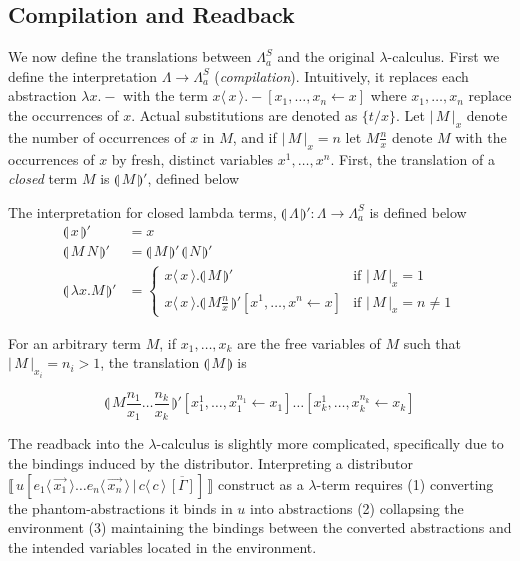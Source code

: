 \documentclass[a4paper,UKenglish,cleveref, autoref]{lipics-v2019}
\newcommand{\FALC}{\Lambda^{S}_{a}}
\newcommand{\abs}[2]{\lambda #1 . #2}
\newcommand{\app}[2]{#1 \, #2}
\newcommand{\fake}[3]{#1 \langle \, #2 \, \rangle . #3}
\newcommand{\share}[3]{#1 [#2 \leftarrow #3]}
\newcommand{\dist}[5]{#1 [ #2 \, \vert \, \fakedist{#4}{#5} \, #3 ]}
\newcommand{\fakedist}[2]{#1 \langle \, #2 \, \rangle}
\newcommand{\size}[1]{\vert \, #1 \, \vert}
\newcommand{\sub}[3]{#1 \{ #2 / #3 \}}
\newcommand{\compile}[1]{\llparenthesis \, #1 \, \rrparenthesis}
\newcommand{\trans}[1]{\llbracket \, #1 \, \rrbracket}
\begin{document}
\subsection{Compilation and Readback}

We now define the translations between $\FALC$ and the original $\lambda$-calculus. First we define the interpretation $\Lambda \rightarrow \FALC$ (\emph{compilation}). Intuitively, it replaces each abstraction $\lambda x . -$ with the term $\fake{x}{x}{\share{-}{x_{1}, \dots, x_{n}}{x}}$ where $x_{1}, \dots, x_{n}$ replace the occurrences of $x$. Actual substitutions are denoted as $\sub{}{t}{x}$. Let $\size{M}_{x}$ denote the number of occurrences of $x$ in $M$, and if $\size{M}_{x} = n$ let $M \frac{n}{x}$ denote $M$ with the occurrences of $x$ by fresh, distinct variables $x^{1}, \dots, x^{n}$. First, the translation of a \emph{closed} term $M$ is $\compile{M}'$, defined below

\begin{definition}[Compilation]
\label{def:compile}
The interpretation for closed lambda terms, $\compile{\Lambda}' : \Lambda \rightarrow \FALC$ is defined below
\begin{align*}
	\compile{x}' &= x \\
	\compile{\app{M}{N}}' &= \app{\compile{M}'}{\compile{N}'} \\
	\compile{\abs{x}{M}}' &=
	\begin{cases}
		\fake{x}{x}{\compile{M}'} & \text{if } \size{M}_{x} = 1 \\
		\fake{x}{x}{\share{\compile{M \frac{n}{x}}'}{x^{1}, \dots, x^{n}}{x}} & \text{if } \size{M}_{x} = n \neq 1
	\end{cases}
\end{align*}
\end{definition}

\noindent For an arbitrary term $M$, if $x_{1}, \dots, x_{k}$ are the free variables of $M$ such that $\size{M}_{x_{i}} = n_{i} > 1$, the translation $\compile{M}$ is

$$\compile{M \frac{n_{1}}{x_{1}} \dots \frac{n_{k}}{x_{k}} }' \share{}{x^{1}_{1}, \dots, x^{n_{1}}_{1}}{x_{1}} \dots \share{}{x^{1}_{k}, \dots, x^{n_{k}}_{k}}{x_{k}}$$

The readback into the $\lambda$-calculus is slightly more complicated, specifically due to the bindings induced by the distributor. Interpreting a distributor $\trans{\dist{u}{\fakedist{e_{1}}{\vec{x_{1}}} \dots \fakedist{e_{n}}{\vec{x_{n}}}}{\overline{[\Gamma]}}{c}{c}}$ construct as a $\lambda$-term requires (1) converting the phantom-abstractions it binds in $u$ into abstractions (2) collapsing the environment (3) maintaining the bindings between the converted abstractions and the intended variables located in the environment.
\end{document}
